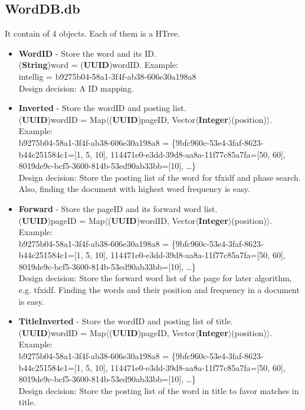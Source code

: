 \documentclass{article}
\begin{document}
    \subsection*{WordDB.db}
    It contain of 4 objects. Each of them is a HTree.
    \begin{itemize}
        \item \textbf{WordID} - Store the word and its ID. \\[0.4em]
        (\textbf{String})word = (\textbf{UUID})wordID. Example:\\[0.4em]
        intellig = b9275b04-58a1-3f4f-ab38-606e30a198a8 \\[0.4em]
        Design decision: A ID mapping.
        \item \textbf{Inverted} - Store the wordID and posting list. \\[0.4em]
        (\textbf{UUID})wordID = Map$\langle$(\textbf{UUID})pageID, Vector$\langle$\textbf{Integer}$\rangle$(position)$\rangle$.
        Example:\\[0.4em]
        b9275b04-58a1-3f4f-ab38-606e30a198a8 = \{9bfc960c-53e4-3faf-8623-b44c251584c1=[1, 5, 10], 114471e0-e3dd-39d8-aa8a-11f77c85a7fa=[50, 60], 8019de9c-bcf5-3600-814b-53ed90ab33bb=[10], \dots \}\\[0.4em]
        Design decision: Store the posting list of the word for tfxidf and phase search. Also, finding the document with highest word frequency is easy.
        \item \textbf{Forward} - Store the pageID and its forward word list. \\[0.4em]
        (\textbf{UUID})pageID = Map$\langle$(\textbf{UUID})wordID, Vector$\langle$\textbf{Integer}$\rangle$(position)$\rangle$.
        Example:\\[0.4em]
        b9275b04-58a1-3f4f-ab38-606e30a198a8 = \{9bfc960c-53e4-3faf-8623-b44c251584c1=[1, 5, 10], 114471e0-e3dd-39d8-aa8a-11f77c85a7fa=[50, 60], 8019de9c-bcf5-3600-814b-53ed90ab33bb=[10], \dots \}\\[0.4em]
        Design decision: Store the forward word list of the page for later algorithm, e.g. tfxidf. Finding the words and their position and frequency in a document is easy.
        \item \textbf{TitleInverted} - Store the wordID and posting list of title. \\[0.4em]
        (\textbf{UUID})wordID = Map$\langle$(\textbf{UUID})pageID, Vector$\langle$\textbf{Integer}$\rangle$(position)$\rangle$.
        Example:\\[0.4em]
        b9275b04-58a1-3f4f-ab38-606e30a198a8 = \{9bfc960c-53e4-3faf-8623-b44c251584c1=[1, 5, 10], 114471e0-e3dd-39d8-aa8a-11f77c85a7fa=[50, 60], 8019de9c-bcf5-3600-814b-53ed90ab33bb=[10], \dots \}\\[0.4em]
        Design decision: Store the posting list of the word in title to favor matches in title.
    \end{itemize}
\end{document}
